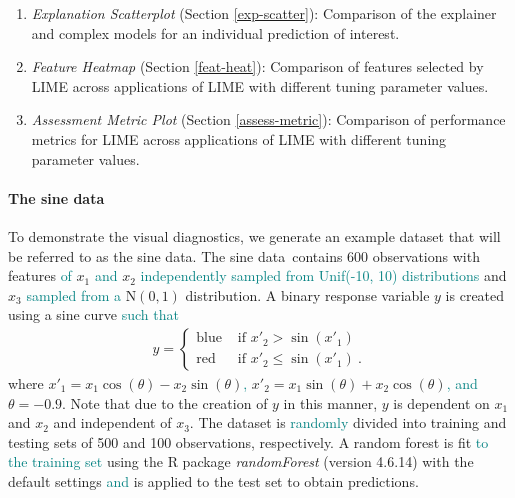 \documentclass[AMS,STIX2COL]{WileyNJD-v2}\usepackage[]{graphicx}\usepackage[]{color}
\newcommand{\kge}[1]{\textcolor{teal}{#1}}
\newcommand{\data}{sine data}
\renewcommand{\sout}[1]{\unskip}
\begin{document}
\begin{enumerate}
\item \emph{Explanation Scatterplot} (Section \ref{exp-scatter}): Comparison of the explainer and complex models for an individual prediction of interest.
\item \emph{Feature Heatmap} (Section \ref{feat-heat}): Comparison of features selected by LIME across applications of LIME with different tuning parameter values.
\item \emph{Assessment Metric Plot} (Section \ref{assess-metric}): Comparison of performance metrics for LIME across applications of LIME with different tuning parameter values. 
\end{enumerate}

\paragraph{The \data}

To demonstrate the visual diagnostics, we generate an example dataset that will be referred to as the \data. The \data \ contains 600 observations with \sout{three features and one response variable. The} features\sout{,} \kge{of} $x_1$\sout{,} \kge{and} $x_2$ \kge{independently sampled from Unif(-10, 10) distributions}\sout{,} and $x_3$\sout{,} \sout{\kge{that} are randomly sampled from Unif(-10, 10), Unif(-10, 10), and} \kge{sampled from a} $\mbox{N}(0,1)$ distribution\sout{s, respectively}. A binary response variable $y$ is created using a \sout{rotated} sine curve \sout{. In particular, let} \kge{such that}
\begin{eqnarray}\label{eq:data}
  y=\begin{cases}
  \mbox{blue} & \mbox{ if } x'_2 > \sin\left(x'_1\right) \\
  \mbox{red} & \mbox{ if } x'_2 \le \sin\left(x'_1\right) \ .
  \end{cases}
\end{eqnarray}
where $x'_1=x_1\cos(\theta)-x_2\sin(\theta)$\kge{,} \sout{and} $x'_2=x_1\sin(\theta)+x_2\cos(\theta)$\kge{, and} \sout{where} $\theta=-0.9$. \sout{Then $y$ is defined as
\begin{eqnarray}\label{eq:data}
  y=\begin{cases}
  \mbox{blue} & \mbox{ if } x'_2 > \sin\left(x'_1\right) \\
  \mbox{red} & \mbox{ if } x'_2 \le \sin\left(x'_1\right) \ .
  \end{cases}
\end{eqnarray}}
Note that due to the creation of $y$ in this manner, $y$ is dependent on $x_1$ and $x_2$ and independent of $x_3$. The dataset is \kge{randomly} divided into training and testing sets of 500 and 100 observations, respectively. A random forest is fit \kge{to the training set} using the R package \emph{randomForest} (version 4.6.14) \citep{liaw:2002} with the default settings\sout{. The model} \kge{and} is applied to the test set to obtain predictions. 
\end{document}
